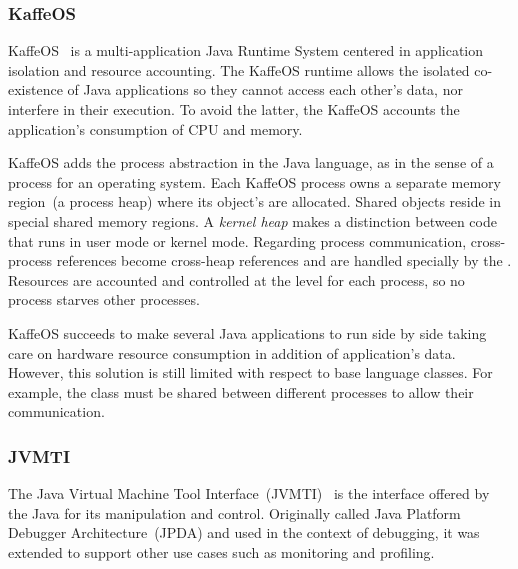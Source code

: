 \subsubsection*{KaffeOS}

KaffeOS~\cite{Back00a} is a multi-application Java Runtime System centered in application isolation and resource accounting. The KaffeOS runtime allows the isolated co-existence of Java applications so they cannot access each other's data, nor interfere in their execution. To avoid the latter, the KaffeOS \VM accounts the application's consumption of CPU and memory.

KaffeOS adds the process abstraction in the Java language, as in the sense of a process for an operating system. Each KaffeOS process owns a separate memory region~(a process heap) where its object's are allocated. Shared objects reside in special shared memory regions. A \emph{kernel heap} makes a distinction between code that runs in user mode or kernel mode. Regarding process communication, cross-process references become cross-heap references and are handled specially by the \VM. Resources are accounted and controlled at the \VM level for each process, so no process starves other processes.

KaffeOS succeeds to make several Java applications to run side by side taking care on hardware resource consumption in addition of application's data. However, this solution is still limited with respect to base language classes. For example, the class  must be shared between different processes to allow their communication.

%


\subsubsection*{JVMTI}
The Java Virtual Machine Tool Interface~(JVMTI)~\cite{JVMPI} is the interface offered by the Java \VM for its manipulation and control. Originally called Java Platform Debugger Architecture~(JPDA) and used in the context of debugging, it was extended to support other use cases such as monitoring and profiling.

